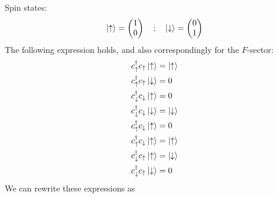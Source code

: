 Spin states: 
\begin{equation*}
	\ket{\uparrow} = \begin{pmatrix}
	1 \\0
	\end{pmatrix}\quad ;\quad 	\ket{\downarrow} = \begin{pmatrix}
	0 \\1
	\end{pmatrix}
\end{equation*}
The following expression holds, and also correspondingly for the $F$-sector: 
\begin{align*}
	c_\uparrow^\dagger c_\uparrow \ket{\uparrow} &= \ket{\uparrow} \\
	c_\uparrow^\dagger c_\uparrow \ket{\downarrow} &= 0 \\
	c_\downarrow^\dagger c_\downarrow \ket{\uparrow} &= 0 \\
	c_\downarrow^\dagger c_\downarrow \ket{\downarrow} &= \ket{\downarrow} \\
	c_\uparrow^\dagger c_\downarrow \ket{\uparrow} &= 0 \\
	c_\uparrow^\dagger c_\downarrow \ket{\uparrow} &= \ket{\uparrow} \\
	c_\downarrow^\dagger c_\uparrow \ket{\uparrow} &= \ket{\downarrow} \\
	c_\downarrow^\dagger c_\uparrow \ket{\downarrow} &= 0 \\
\end{align*}
We can rewrite these expressions as 

